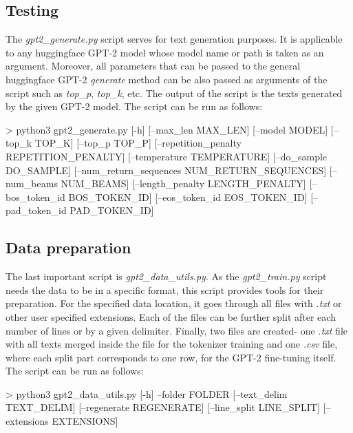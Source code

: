 \subsection*{Testing}
The \textit{gpt2\_generate.py} script serves for text generation purposes. It is applicable to any huggingface GPT-2 model whose model name or path is taken as an argument. Moreover, all parameters that can be passed to the general huggingface GPT-2 \textit{generate} method can be also passed as arguments of the script such as \textit{top\_p}, \textit{top\_k}, etc. The output of the script is the texts generated by the given GPT-2 model. The script can be run as follows:
\begin{code}
> python3 gpt2_generate.py [-h] [--max_len MAX_LEN] 
                          [--model MODEL] 
                          [--top_k TOP_K] 
                          [--top_p TOP_P] 
                          [--repetition_penalty REPETITION_PENALTY] 
                          [--temperature TEMPERATURE] 
                          [--do_sample DO_SAMPLE]
                          [--num_return_sequences NUM_RETURN_SEQUENCES]
                          [--num_beams NUM_BEAMS]
                          [--length_penalty LENGTH_PENALTY] 
                          [--bos_token_id BOS_TOKEN_ID] 
                          [--eos_token_id EOS_TOKEN_ID]
                          [--pad_token_id PAD_TOKEN_ID]
\end{code}

\subsection*{Data preparation}
The last important script is \textit{gpt2\_data\_utils.py}. As the \textit{gpt2\_train.py} script needs the data to be in a specific format, this script provides tools for their preparation. For the specified data location, it goes through all files with \textit{.txt} or other user specified extensions. Each of the files can be further split after each number of lines or by a given delimiter. Finally, two files are created- one \textit{.txt} file with all texts merged inside the file for the tokenizer training and one \textit{.csv} file, where each split part corresponds to one row, for the GPT-2 fine-tuning itself. The script can be run as follows:\\
\begin{code}
> python3 gpt2_data_utils.py [-h] --folder FOLDER 
                             [--text_delim TEXT_DELIM] 
                             [--regenerate REGENERATE] 
                             [--line_split LINE_SPLIT] 
                             [--extensions EXTENSIONS]
\end{code}


